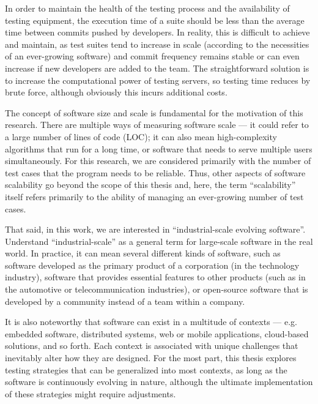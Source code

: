 In order to maintain the health of the testing process and the availability of testing equipment, the execution time of a suite should be less than the average time between commits pushed by developers.
In reality, this is difficult to achieve and maintain, as test suites tend to increase in scale (according to the necessities of an ever-growing software) and commit frequency remains stable or can even increase if new developers are added to the team.
The straightforward solution is to increase the computational power of testing servers, so testing time reduces by brute force, although obviously this incurs additional costs.

The concept of software size and scale is fundamental for the motivation of this research.
There are multiple ways of measuring software scale --- it could refer to a large number of lines of code (LOC); it can also mean high-complexity algorithms that run for a long time, or software that needs to serve multiple users simultaneously.
For this research, we are considered primarily with the number of test cases that the program needs to be reliable.
Thus, other aspects of software scalability go beyond the scope of this thesis and, here, the term ``scalability'' itself refers primarily to the ability of managing an ever-growing number of test cases.

That said, in this work, we are interested in ``industrial-scale evolving software''.
Understand ``industrial-scale'' as a general term for large-scale software in the real world.
In practice, it can mean several different kinds of software, such as software developed as the primary product of a corporation (in the technology industry), software that provides essential features to other products (such as in the automotive or telecommunication industries), or open-source software that is developed by a community instead of a team within a company.

It is also noteworthy that software can exist in a multitude of contexts --- e.g. embedded software, distributed systems, web or mobile applications, cloud-based solutions, and so forth.
Each context is associated with unique challenges that inevitably alter how they are designed.
For the most part, this thesis explores testing strategies that can be generalized into most contexts, as long as the software is continuously evolving in nature, although the ultimate implementation of these strategies might require adjustments.
